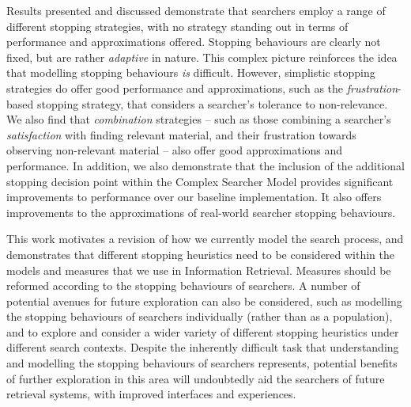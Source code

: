\begin{preamble}
Results presented and discussed demonstrate that searchers employ a range of different stopping strategies, with no strategy standing out in terms of performance and approximations offered. Stopping behaviours are clearly not fixed, but are rather \emph{adaptive} in nature. This complex picture reinforces the idea that modelling stopping behaviours \emph{is} difficult. However, simplistic stopping strategies do offer good performance and approximations, such as the \emph{frustration}-based stopping strategy, that considers a searcher's tolerance to non-relevance. We also find that \emph{combination} strategies -- such as those combining a searcher's \emph{satisfaction} with finding relevant material, and their frustration towards observing non-relevant material -- also offer good approximations and performance. In addition, we also demonstrate that the inclusion of the additional stopping decision point within the Complex Searcher Model provides significant improvements to performance over our baseline implementation. It also offers improvements to the approximations of real-world searcher stopping behaviours.

This work motivates a revision of how we currently model the search process, and demonstrates that different stopping heuristics need to be considered within the models and measures that we use in Information Retrieval. Measures should be reformed according to the stopping behaviours of searchers. A number of potential avenues for future exploration can also be considered, such as modelling the stopping behaviours of searchers individually (rather than as a population), and to explore and consider a wider variety of different stopping heuristics under different search contexts. Despite the inherently difficult task that understanding and modelling the stopping behaviours of searchers represents, potential benefits of further exploration in this area will undoubtedly aid the searchers of future retrieval systems, with improved interfaces and experiences.

\end{preamble}